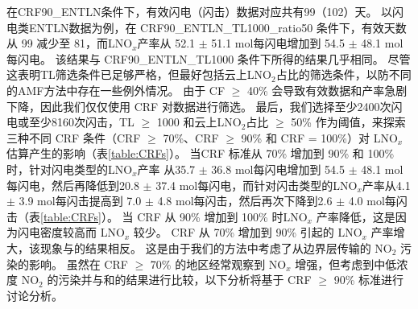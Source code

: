 在CRF90\_ENTLN条件下，有效闪电（闪击）数据对应共有99（102）天。
以闪电类ENTLN数据为例，在 CRF90\_ENTLN\_TL1000\_ratio50 条件下，有效天数从 99 减少至 81，而LNO$_x$产率从 52.1 $\pm$ 51.1 mol每闪电增加到 54.5 $\pm$ 48.1 mol每闪电。
该结果与 CRF90\_ENTLN\_TL1000 条件下所得的结果几乎相同。
尽管这表明TL筛选条件已足够严格，但最好包括云上LNO$_2$占比的筛选条件，以防不同的AMF方法中存在一些例外情况。
由于 CF $\geq$ 40\% 会导致有效数据和产率急剧下降，因此我们仅仅使用 CRF 对数据进行筛选。
最后，我们选择至少2400次闪电或至少8160次闪击，TL $\geq$ 1000 和云上LNO$_2$占比 $\geq$ 50\% 作为阈值，来探索三种不同 CRF 条件（CRF $\geq$ 70\%、CRF $\geq$ 90\% 和 CRF = 100\%）对 LNO$_x$ 估算产生的影响（表\ref{table:CRFs}）。
当CRF 标准从 70\% 增加到 90\% 和 100\%时，针对闪电类型的LNO$_x$产率 从35.7 $\pm$ 36.8 mol每闪电增加到 54.5 $\pm$ 48.1 mol每闪电，然后再降低到20.8 $\pm$ 37.4 mol每闪电，而针对闪击类型的LNO$_x$产率从4.1 $\pm$ 3.9 mol每闪击提高到 7.0 $\pm$ 4.8 mol每闪击，然后再次下降到2.6 $\pm$ 4.0 mol每闪击（表\ref{table:CRFs}）。
当 CRF 从 90\% 增加到 100\% 时LNO$_x$ 产率降低，这是因为闪电密度较高而 LNO$_x$ 较少。
CRF 从 70\% 增加到 90\% 引起的 LNO$_x$ 产率增大，该现象与\citet{Pickering.2016}的结果相反。
这是由于我们的方法中考虑了从边界层传输的 NO$_2$ 污染的影响。
虽然在 CRF $\geq$ 70\% 的地区经常观察到 NO$_x$ 增强\citep{Pickering.2016}，但考虑到中低浓度 NO$_2$ 的污染并与\citet{Pickering.2016}和\citet{Lapierre.2020}的结果进行比较，以下分析将基于 CRF $\geq$ 90\% 标准进行讨论分析。

